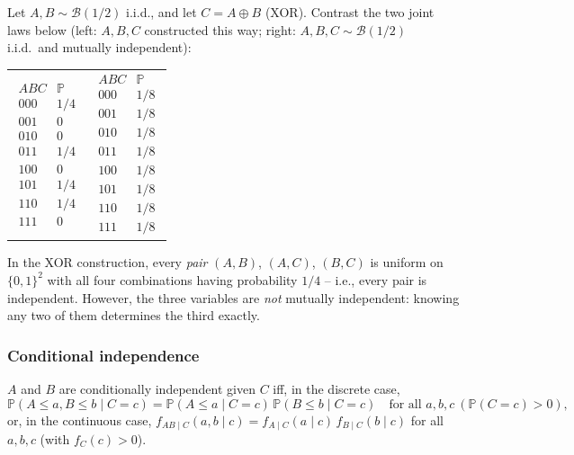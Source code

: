 \begin{example}
Let $A, B \sim \mathcal{B}(1/2)$ i.i.d., and let $C = A \oplus B$ (XOR). Contrast the two joint laws below (left: $A,B,C$ constructed this way; right: $A,B,C \sim \mathcal{B}(1/2)$ i.i.d.\ and mutually independent):

\begin{center}
\begin{tabular}{cc}
$\begin{array}{c|c}
ABC & \mathbb{P} \\
\hline
000 & 1/4 \\
001 & 0 \\
010 & 0 \\
011 & 1/4 \\
100 & 0 \\
101 & 1/4 \\
110 & 1/4 \\
111 & 0
\end{array}$
&
$\begin{array}{c|c}
ABC & \mathbb{P} \\
\hline
000 & 1/8 \\
001 & 1/8 \\
010 & 1/8 \\
011 & 1/8 \\
100 & 1/8 \\
101 & 1/8 \\
110 & 1/8 \\
111 & 1/8
\end{array}$
\end{tabular}
\end{center}

In the XOR construction, every \emph{pair} $(A,B)$, $(A,C)$, $(B,C)$ is uniform on $\{0,1\}^2$ with all four combinations having probability $1/4$ -- i.e., every pair is independent. However, the three variables are \emph{not} mutually independent: knowing any two of them determines the third exactly.
\end{example}

\subsubsection*{Conditional independence}

\begin{definition}
$A$ and $B$ are conditionally independent given $C$ iff, in the discrete case,
\[
\mathbb{P}(A \leq a, B \leq b \mid C = c) = \mathbb{P}(A \leq a \mid C = c)\, \mathbb{P}(B \leq b \mid C = c) \quad \text{for all } a,b,c \ (\mathbb{P}(C=c) > 0),
\]
or, in the continuous case, $f_{AB \mid C}(a,b \mid c) = f_{A \mid C}(a \mid c)\, f_{B \mid C}(b \mid c)$ for all $a,b,c$ (with $f_C(c) > 0$).
\end{definition}

